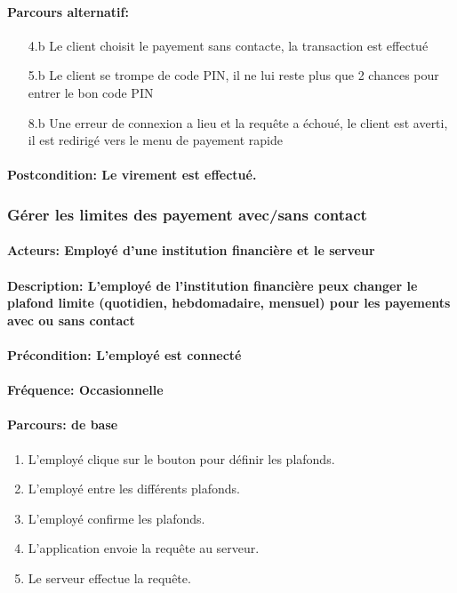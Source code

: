 \documentclass[../annexe.tex]{subfiles}
\begin{document}
            \paragraph{Parcours alternatif:} 
        \begin{itemize}
            \item[4.b] Le client choisit le payement sans contacte, la transaction est effectué
            \item[5.b] Le client se trompe de code PIN, il ne lui reste plus que 2 chances pour entrer le bon code PIN
            \item[8.b] Une erreur de connexion a lieu et la requête a échoué, le client est averti, il est redirigé vers le menu de payement rapide
        \end{itemize} 
        \paragraph{Postcondition: Le virement est effectué.}
\newpage
  
        \subsubsection{Gérer les limites des payement avec/sans contact}
  
        \paragraph{Acteurs: Employé d’une institution financière et le serveur}
        \paragraph{Description: L’employé de l’institution financière peux changer le plafond limite (quotidien, hebdomadaire, mensuel) pour les payements avec ou sans contact}
        \paragraph{Précondition: L’em­ployé est connecté} 
        \paragraph{Fréquence: Occasionnelle}
        \paragraph{Parcours: de base} 
        \begin{enumerate}
            \item  L’employé clique sur le bouton pour définir les plafonds.
            \item  L’employé entre les différents plafonds.
            \item  L’employé confirme les plafonds.
            \item  L’application envoie la requête au serveur.
            \item  Le serveur effectue la requête.
        \end{enumerate}
\end{document}
